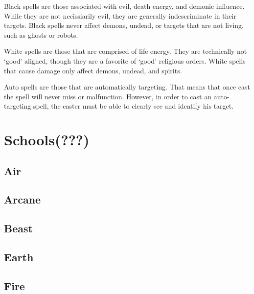 \documentclass[twoside]{book}
\begin{document}
              
                  Black   spells are those
                  associated with evil, death energy, and demonic
                  influence. While they are not necissiarily evil, they
                  are generally indescriminate in their targets. Black
                  spells never affect demons, undead, or targets that are
                  not living, such as ghosts or robots.
                
              
                  White   spells are those
                  that are comprised of life energy. They are technically
                  not `good' aligned, though they are a
                  favorite of `good' religious orders. White
                  spells that cause damage only affect demons, undead,
                  and spirits.
                
              
                  Auto   spells are those that
                  are automatically targeting. That means that once cast
                  the spell will never miss or malfunction. However, in
                  order to cast an auto-targeting spell, the caster must
                  be able to clearly see and identify his target.
                
            
\section{Schools(???)}
    
\subsection{Air}
    
\subsection{Arcane}
    
\subsection{Beast}
    
\subsection{Earth}
    
\subsection{Fire}
    
\end{document}
